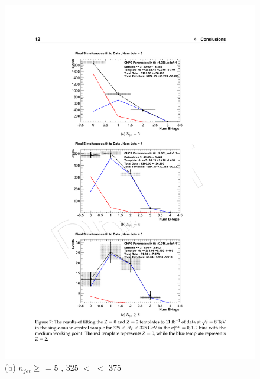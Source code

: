 \begin{figure}[ht]
\begin{minipage}[b]{0.48\linewidth}
\includegraphics[width = 1.0\linewidth]{plots/template_data_medium_njet5_midht.pdf}
\centering (b) $n_{jet} \geq$ = 5 , 325 $<$ \theht $<$ 375 
\end{minipage}
\quad
\begin{minipage}[b]{0.48\linewidth}
\centering

\end{minipage}
\end{figure}
